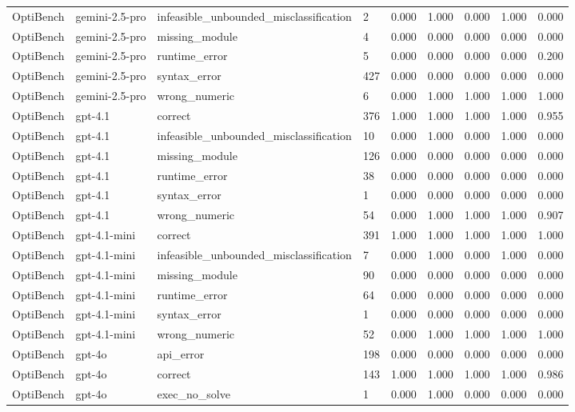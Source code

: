 \begin{table}[t]
\begin{tabular}{lllllllll}
OptiBench & gemini-2.5-pro & infeasible\_unbounded\_misclassification & 2 & 0.000 & 1.000 & 0.000 & 1.000 & 0.000 \\
OptiBench & gemini-2.5-pro & missing\_module & 4 & 0.000 & 0.000 & 0.000 & 0.000 & 0.000 \\
OptiBench & gemini-2.5-pro & runtime\_error & 5 & 0.000 & 0.000 & 0.000 & 0.000 & 0.200 \\
OptiBench & gemini-2.5-pro & syntax\_error & 427 & 0.000 & 0.000 & 0.000 & 0.000 & 0.000 \\
OptiBench & gemini-2.5-pro & wrong\_numeric & 6 & 0.000 & 1.000 & 1.000 & 1.000 & 1.000 \\
OptiBench & gpt-4.1 & correct & 376 & 1.000 & 1.000 & 1.000 & 1.000 & 0.955 \\
OptiBench & gpt-4.1 & infeasible\_unbounded\_misclassification & 10 & 0.000 & 1.000 & 0.000 & 1.000 & 0.000 \\
OptiBench & gpt-4.1 & missing\_module & 126 & 0.000 & 0.000 & 0.000 & 0.000 & 0.000 \\
OptiBench & gpt-4.1 & runtime\_error & 38 & 0.000 & 0.000 & 0.000 & 0.000 & 0.000 \\
OptiBench & gpt-4.1 & syntax\_error & 1 & 0.000 & 0.000 & 0.000 & 0.000 & 0.000 \\
OptiBench & gpt-4.1 & wrong\_numeric & 54 & 0.000 & 1.000 & 1.000 & 1.000 & 0.907 \\
OptiBench & gpt-4.1-mini & correct & 391 & 1.000 & 1.000 & 1.000 & 1.000 & 1.000 \\
OptiBench & gpt-4.1-mini & infeasible\_unbounded\_misclassification & 7 & 0.000 & 1.000 & 0.000 & 1.000 & 0.000 \\
OptiBench & gpt-4.1-mini & missing\_module & 90 & 0.000 & 0.000 & 0.000 & 0.000 & 0.000 \\
OptiBench & gpt-4.1-mini & runtime\_error & 64 & 0.000 & 0.000 & 0.000 & 0.000 & 0.000 \\
OptiBench & gpt-4.1-mini & syntax\_error & 1 & 0.000 & 0.000 & 0.000 & 0.000 & 0.000 \\
OptiBench & gpt-4.1-mini & wrong\_numeric & 52 & 0.000 & 1.000 & 1.000 & 1.000 & 1.000 \\
OptiBench & gpt-4o & api\_error & 198 & 0.000 & 0.000 & 0.000 & 0.000 & 0.000 \\
OptiBench & gpt-4o & correct & 143 & 1.000 & 1.000 & 1.000 & 1.000 & 0.986 \\
OptiBench & gpt-4o & exec\_no\_solve & 1 & 0.000 & 1.000 & 0.000 & 0.000 & 0.000 \\

\end{tabular}
\end{table}
